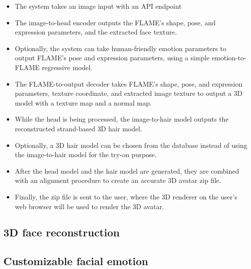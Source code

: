 


\begin{itemize}
    \item The system takes an image input with an API endpoint
    \item The image-to-head encoder outputs the FLAME's shape, pose, and expression parameters, and the extracted face texture.
    \item Optionally, the system can take human-friendly emotion parameters to output FLAME's pose and expression parameters, using a simple emotion-to-FLAME regressive model.
    \item The FLAME-to-output decoder takes FLAME's shape, pose, and expression parameters, texture coordinate, and extracted image texture to output a 3D model with a texture map and a normal map.
    \item While the head is being processed, the image-to-hair model outputs the reconstructed strand-based 3D hair model.
    \item Optionally, a 3D hair model can be chosen from the database instead of using the image-to-hair model for the try-on purpose.
    \item After the head model and the hair model are generated, they are combined with an alignment procedure to create an accurate 3D avatar zip file.
    \item Finally, the zip file is sent to the user, where the 3D renderer on the user's web browser will be used to render the 3D avatar.
\end{itemize}


\subsection{3D face reconstruction}

\subsection{Customizable facial emotion}

